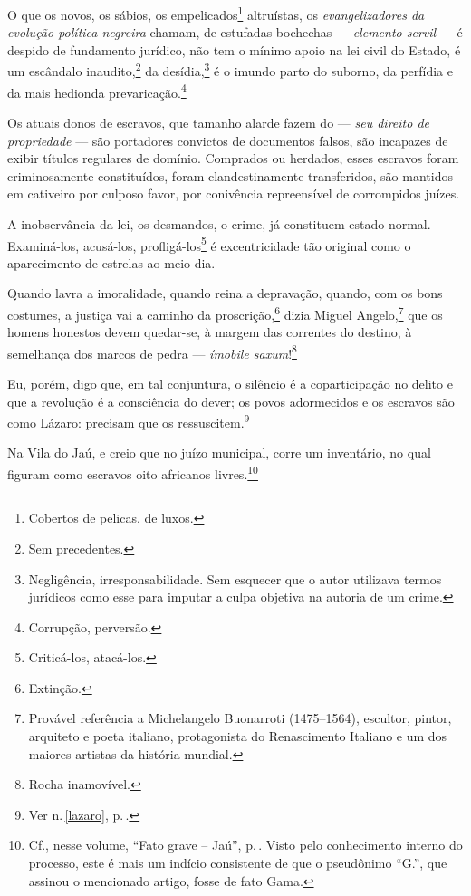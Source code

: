O que os novos, os sábios, os empelicados\footnote{Cobertos de
  pelicas, de luxos.} altruístas, os \emph{evangelizadores da evolução
política negreira} chamam, de estufadas bochechas --- \emph{elemento %
servil} --- é despido de fundamento jurídico, não tem o mínimo apoio na
lei civil do Estado, é um escândalo inaudito,\footnote{Sem precedentes.}
da desídia,\footnote{Negligência, irresponsabilidade. Sem esquecer que
  o autor utilizava termos jurídicos como esse para imputar a culpa
  objetiva na autoria de um crime.} é o imundo parto do suborno, da
perfídia e da mais hedionda prevaricação.\footnote{Corrupção,
  perversão.}

Os atuais donos de escravos, que tamanho alarde fazem do --- \emph{seu %
direito de propriedade} --- são portadores convictos de documentos
falsos, são incapazes de exibir títulos regulares de domínio. Comprados
ou herdados, esses escravos foram criminosamente constituídos, foram
clandestinamente transferidos, são mantidos em cativeiro por culposo
favor, por conivência repreensível de corrompidos juízes.

A inobservância da lei, os desmandos, o crime, já constituem estado
normal. Examiná-los, acusá-los, profligá-los\footnote{Criticá-los,
  atacá-los.} é excentricidade tão original como o aparecimento de
estrelas ao meio dia.

Quando lavra a imoralidade, quando reina a depravação, quando, com os
bons costumes, a justiça vai a caminho da proscrição,\footnote{Extinção.}
dizia Miguel Angelo,\footnote{Provável referência a Michelangelo
  Buonarroti (1475--1564), escultor, pintor, arquiteto e poeta italiano,
  protagonista do Renascimento Italiano e um dos maiores artistas da
  história mundial.} que os homens honestos devem quedar-se, à margem
das correntes do destino, à semelhança dos marcos de pedra ---
\emph{ímobile saxum}!\footnote{Rocha inamovível.}

Eu, porém, digo que, em tal conjuntura, o silêncio é a coparticipação no
delito e que a revolução é a consciência do dever; os povos adormecidos
e os escravos são como Lázaro: precisam que os ressuscitem.\footnote{Ver n.\,\ref{lazaro}, p.\,\pageref{lazaro}.}

Na Vila do Jaú, e creio que no juízo municipal, corre um inventário, no
qual figuram como escravos oito africanos livres.\footnote{Cf., nesse
  volume, ``Fato grave -- Jaú'', p.\,\pageref{jau}. Visto pelo conhecimento
  interno do processo, este é mais um indício consistente de que o
  pseudônimo ``G.'', que assinou o mencionado artigo, fosse de fato Gama.}

